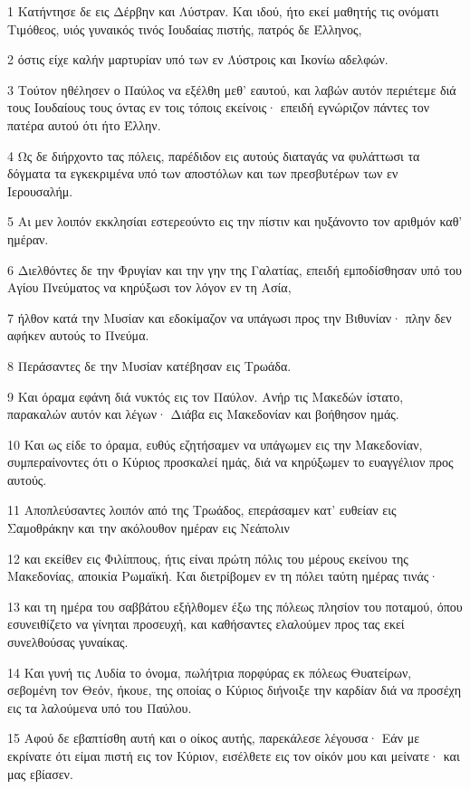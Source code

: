\par 1 Κατήντησε δε εις Δέρβην και Λύστραν. Και ιδού, ήτο εκεί μαθητής τις ονόματι Τιμόθεος, υιός γυναικός τινός Ιουδαίας πιστής, πατρός δε Έλληνος,
\par 2 όστις είχε καλήν μαρτυρίαν υπό των εν Λύστροις και Ικονίω αδελφών.
\par 3 Τούτον ηθέλησεν ο Παύλος να εξέλθη μεθ' εαυτού, και λαβών αυτόν περιέτεμε διά τους Ιουδαίους τους όντας εν τοις τόποις εκείνοις· επειδή εγνώριζον πάντες τον πατέρα αυτού ότι ήτο Έλλην.
\par 4 Ως δε διήρχοντο τας πόλεις, παρέδιδον εις αυτούς διαταγάς να φυλάττωσι τα δόγματα τα εγκεκριμένα υπό των αποστόλων και των πρεσβυτέρων των εν Ιερουσαλήμ.
\par 5 Αι μεν λοιπόν εκκλησίαι εστερεούντο εις την πίστιν και ηυξάνοντο τον αριθμόν καθ' ημέραν.
\par 6 Διελθόντες δε την Φρυγίαν και την γην της Γαλατίας, επειδή εμποδίσθησαν υπό του Αγίου Πνεύματος να κηρύξωσι τον λόγον εν τη Ασία,
\par 7 ήλθον κατά την Μυσίαν και εδοκίμαζον να υπάγωσι προς την Βιθυνίαν· πλην δεν αφήκεν αυτούς το Πνεύμα.
\par 8 Περάσαντες δε την Μυσίαν κατέβησαν εις Τρωάδα.
\par 9 Και όραμα εφάνη διά νυκτός εις τον Παύλον. Ανήρ τις Μακεδών ίστατο, παρακαλών αυτόν και λέγων· Διάβα εις Μακεδονίαν και βοήθησον ημάς.
\par 10 Και ως είδε το όραμα, ευθύς εζητήσαμεν να υπάγωμεν εις την Μακεδονίαν, συμπεραίνοντες ότι ο Κύριος προσκαλεί ημάς, διά να κηρύξωμεν το ευαγγέλιον προς αυτούς.
\par 11 Αποπλεύσαντες λοιπόν από της Τρωάδος, επεράσαμεν κατ' ευθείαν εις Σαμοθράκην και την ακόλουθον ημέραν εις Νεάπολιν
\par 12 και εκείθεν εις Φιλίππους, ήτις είναι πρώτη πόλις του μέρους εκείνου της Μακεδονίας, αποικία Ρωμαϊκή. Και διετρίβομεν εν τη πόλει ταύτη ημέρας τινάς·
\par 13 και τη ημέρα του σαββάτου εξήλθομεν έξω της πόλεως πλησίον του ποταμού, όπου εσυνειθίζετο να γίνηται προσευχή, και καθήσαντες ελαλούμεν προς τας εκεί συνελθούσας γυναίκας.
\par 14 Και γυνή τις Λυδία το όνομα, πωλήτρια πορφύρας εκ πόλεως Θυατείρων, σεβομένη τον Θεόν, ήκουε, της οποίας ο Κύριος διήνοιξε την καρδίαν διά να προσέχη εις τα λαλούμενα υπό του Παύλου.
\par 15 Αφού δε εβαπτίσθη αυτή και ο οίκος αυτής, παρεκάλεσε λέγουσα· Εάν με εκρίνατε ότι είμαι πιστή εις τον Κύριον, εισέλθετε εις τον οίκόν μου και μείνατε· και μας εβίασεν.

